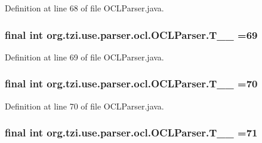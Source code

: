 Definition at line 68 of file O\-C\-L\-Parser.\-java.

\hypertarget{classorg_1_1tzi_1_1use_1_1parser_1_1ocl_1_1_o_c_l_parser_a0893950889bc1694fb0ba4eff04e8bc9}{
\subsubsection[{T\-\_\-\-\_\-69}]{\setlength{\rightskip}{0pt plus 5cm}final int org.\-tzi.\-use.\-parser.\-ocl.\-O\-C\-L\-Parser.\-T\-\_\-\-\_ =69\hspace{0.3cm}{\ttfamily [static]}}}\label{classorg_1_1tzi_1_1use_1_1parser_1_1ocl_1_1_o_c_l_parser_a0893950889bc1694fb0ba4eff04e8bc9}


Definition at line 69 of file O\-C\-L\-Parser.\-java.

\hypertarget{classorg_1_1tzi_1_1use_1_1parser_1_1ocl_1_1_o_c_l_parser_a56597c4703928b6a4b44f4b3049e90f8}{
\subsubsection[{T\-\_\-\-\_\-70}]{\setlength{\rightskip}{0pt plus 5cm}final int org.\-tzi.\-use.\-parser.\-ocl.\-O\-C\-L\-Parser.\-T\-\_\-\-\_ =70\hspace{0.3cm}{\ttfamily [static]}}}\label{classorg_1_1tzi_1_1use_1_1parser_1_1ocl_1_1_o_c_l_parser_a56597c4703928b6a4b44f4b3049e90f8}


Definition at line 70 of file O\-C\-L\-Parser.\-java.

\hypertarget{classorg_1_1tzi_1_1use_1_1parser_1_1ocl_1_1_o_c_l_parser_a80ee989c9fccdfe7476e707f9c9c6a08}{
\subsubsection[{T\-\_\-\-\_\-71}]{\setlength{\rightskip}{0pt plus 5cm}final int org.\-tzi.\-use.\-parser.\-ocl.\-O\-C\-L\-Parser.\-T\-\_\-\-\_ =71\hspace{0.3cm}{\ttfamily [static]}}}\label{classorg_1_1tzi_1_1use_1_1parser_1_1ocl_1_1_o_c_l_parser_a80ee989c9fccdfe7476e707f9c9c6a08}


